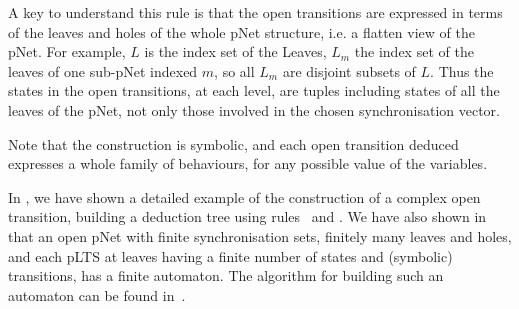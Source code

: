 \documentclass{lmcs}
\newcommand{\TODO}[1]{\textcolor{red}{\textbf{[TODO:#1]}}}
\begin{document}
        	A key to understand this rule is that the open transitions are
	expressed in terms of the leaves and holes of the whole pNet structure,
	i.e. a flatten view of the pNet. For example, $L$ is the index set of the
	Leaves, $L_m$ the index set of the leaves of one sub-pNet indexed $m$, so all $L_m$
	are disjoint subsets of $L$. Thus the states in the open transitions,
	at each level, are tuples including states of all the
	leaves of the pNet, not only those involved in the chosen
	synchronisation vector.


Note that  the construction is symbolic, and each open transition deduced expresses a whole family of
behaviours, for any possible value of the variables.
%

In \cite{henrio:Forte2016}, we have  shown a detailed example of the construction of a complex open transition, building a deduction tree using rules \TrUn ~and \TrDeux.
We have also shown in \cite{henrio:Forte2016} that an open pNet
with finite synchronisation sets, finitely many leaves and
holes, and each pLTS at leaves having a finite number of states and
(symbolic) transitions, has a finite automaton. The algorithm for building such an automaton can be found in~\cite{QBMZ-AVOCS18}.




\end{document}
